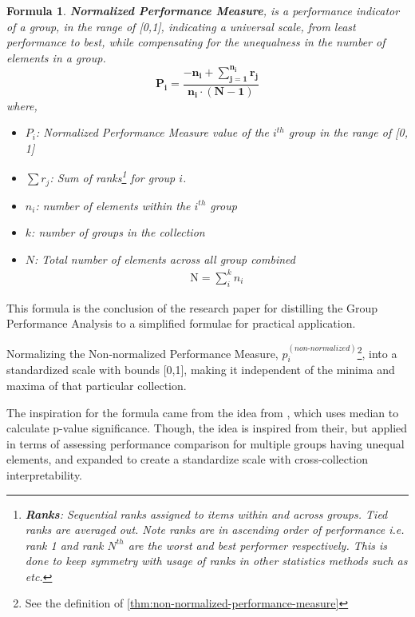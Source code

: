 \documentclass[a4paper,fleqn,review]{cas-sc}
\newtheorem{theorem}{Formula}
\begin{document}
\begin{theorem}\label{thm:normalized-performance-measure}
	\textbf{Normalized Performance Measure}, is a performance indicator of a group, in the range of [0,1], indicating a universal scale, from least performance to best, while compensating for the unequalness in the number of elements in a group.
	\begin{equation}
		\boxed{
			\mathbf{
				P_i = \frac{-n_i +  \sum\limits_{j=1}^{n_i} r_j}{n_i \cdot (N - 1)}}
		}
	\label{eq:normalized-performance-measure}	
	\end{equation}
where,
	\begin{itemize}
		\item[] \textbf{$P_i$}: Normalized Performance Measure value of the $i^{th}$ group in the range of [0, 1]
		\item[] \textbf{$\sum r_j$}: Sum of ranks\footnote{{\textbf{Ranks}: Sequential ranks assigned to items within and across groups. Tied ranks are averaged out. Note ranks are in ascending order of performance i.e. rank 1 and rank $N^{th}$ are the worst and best performer respectively. This is done to keep symmetry with usage of ranks in other statistics methods such as \cite{mann1947test} etc.}} for group $i$.
		\item[] \textbf{$n_i$}: number of elements within the $i^{th}$ group
		\item[] \textbf{$k$}: number of groups in the collection
		\item[] \textbf{$N$}: Total number of elements across all group combined
		\begin{align*}
			\text{N} = \sum\limits_i^k n_i
		\end{align*}
	\end{itemize}
\end{theorem}

This formula is the conclusion of the research paper for distilling the Group Performance Analysis to a simplified formulae for practical application.

\begin{pot}[\ref{thm:normalized-performance-measure}]
	Normalizing the Non-normalized Performance Measure, $p_i^{(non\text{-}normalized)}$\footnote{See the definition of \autoref{thm:non-normalized-performance-measure}}, into a standardized scale with bounds [0,1], making it independent of the minima and maxima of that particular collection.
\end{pot}

The inspiration for the formula came from the idea from \cite{mann1947test}, which uses median to calculate p-value significance. Though, the idea is inspired from their, but applied in terms of assessing performance comparison for multiple groups having unequal elements, and expanded to create a standardize scale with cross-collection interpretability.
\end{document}
